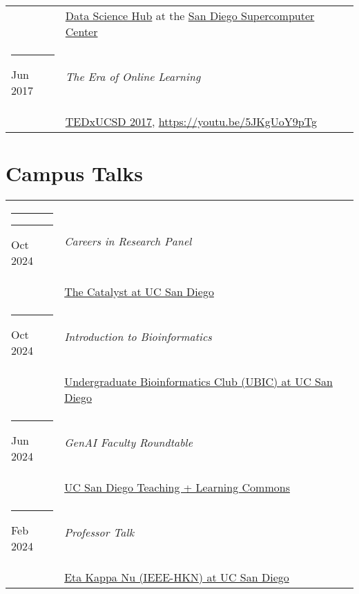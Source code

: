 \documentclass[margin,line]{res}
\begin{document}
\begin{resume}
\begin{longtable}{@{}p{0.7in}p{4in}}
\hspace*{-4mm} & \hspace{4mm} \href{https://datascience.sdsc.edu/}{Data Science Hub} at the \href{https://www.sdsc.edu/}{San Diego Supercomputer Center}\\
\hspace*{-4mm} \rule{-1mm}{5mm} Jun 2017 & \textit{The Era of Online Learning}\\*
\hspace*{-4mm} & \hspace{4mm} \href{https://www.ted.com/tedx/events/22004}{TEDxUCSD 2017}, \href{https://youtu.be/5JKgUoY9pTg}{https://youtu.be/5JKgUoY9pTg}\\
\end{longtable}

\section{\sc Campus Talks}
\begin{longtable}{@{}p{0.7in}p{4in}}\rule{-1mm}{4.5mm}
\hspace*{-4mm} \rule{-1mm}{5mm} Oct 2024 & \textit{Careers in Research Panel}\\*
\hspace*{-4mm} & \hspace{4mm} \href{https://escholarship.org/uc/ucsd_aep_catalyst}{The Catalyst at UC San Diego}\\
\hspace*{-4mm} \rule{-1mm}{5mm} Oct 2024 & \textit{Introduction to Bioinformatics}\\*
\hspace*{-4mm} & \hspace{4mm} \href{https://ubicucsd.github.io/}{Undergraduate Bioinformatics Club (UBIC) at UC San Diego}\\
\hspace*{-4mm} \rule{-1mm}{5mm} Jun 2024 & \textit{GenAI Faculty Roundtable}\\*
\hspace*{-4mm} & \hspace{4mm} \href{https://commons.ucsd.edu/}{UC San Diego Teaching + Learning Commons}\\
\hspace*{-4mm} \rule{-1mm}{5mm} Feb 2024 & \textit{Professor Talk}\\*
\hspace*{-4mm} & \hspace{4mm} \href{https://hkn.ucsd.edu/}{Eta Kappa Nu (IEEE-HKN) at UC San Diego}\\

\end{longtable}
\end{resume}
\end{document}
